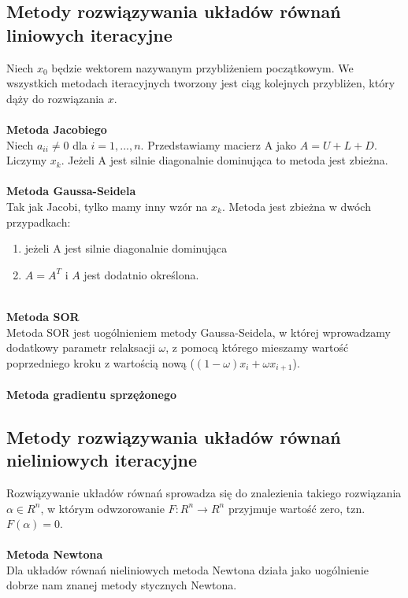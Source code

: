 \documentclass[12pt]{article}
\begin{document}
\subsection{Metody rozwiązywania układów równań liniowych iteracyjne}
Niech $x_{0}$ będzie wektorem nazywanym przybliżeniem początkowym. We wszystkich metodach iteracyjnych tworzony jest ciąg kolejnych przybliżen, który dąży do rozwiązania $x$.\\
~\\
\textbf{Metoda Jacobiego}\\
Niech $a_{ii} \neq 0$ dla $i = 1,...,n$. Przedstawiamy macierz A jako $A = U + L + D$. Liczymy $x_{k}$. Jeżeli A jest silnie diagonalnie dominująca to metoda jest zbieżna.\\
~\\
\textbf{Metoda Gaussa-Seidela}\\
Tak jak Jacobi, tylko mamy inny wzór na $x_{k}$. Metoda jest zbieżna w dwóch przypadkach:
\begin{enumerate}
	\item jeżeli A jest silnie diagonalnie dominująca
	\item $A = A^{T}$ i $A$ jest dodatnio określona.
\end{enumerate}
~\\
\textbf{Metoda SOR}\\
Metoda SOR jest uogólnieniem metody Gaussa-Seidela, w której wprowadzamy dodatkowy parametr relaksacji $\omega$, z pomocą którego mieszamy wartość poprzedniego kroku z wartością nową ($(1-\omega)x_{i} + \omega x_{i+1}$).\\
~\\
\textbf{Metoda gradientu sprzężonego}

\subsection{Metody rozwiązywania układów równań nieliniowych iteracyjne}
Rozwiązywanie układów równań sprowadza się do znalezienia takiego rozwiązania $\alpha \in R^{n}$, w którym odwzorowanie $F: R^{n} \rightarrow R^{n}$ przyjmuje wartość zero, tzn. $F(\alpha) = 0$.\\
~\\
\textbf{Metoda Newtona}\\
Dla układów równań nieliniowych metoda Newtona działa jako uogólnienie dobrze nam znanej metody stycznych Newtona. 
\end{document}
